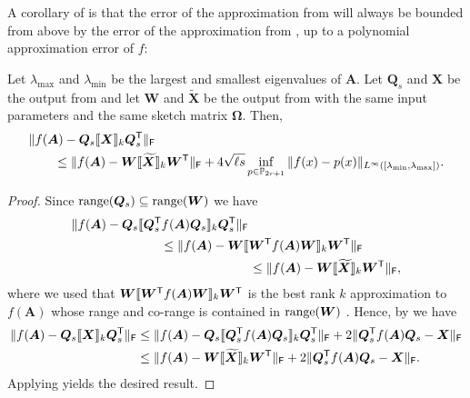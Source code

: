 A corollary of  is that the error of the approximation from  will always be bounded from above by the error of the approximation from , up to a polynomial approximation error of $f$:
\begin{corollary}
\label{corr:early_bigger_subspace}
    Let $\lambda_{\max}$ and $\lambda_{\min}$ be the largest and smallest eigenvalues of $\bm{A}$. Let $\bm{Q}_s$ and $\bm{X}$ be the output from  and let $\bm{W}$ and $\widetilde{\bm{X}}$ be the output from  with the same input parameters and the same sketch matrix $\bm{\Omega}$. Then,
    \begin{align*}
        &\|f(\bm{A}) - \bm{Q}_s \llbracket\bm{X}\rrbracket_k \bm{Q}_s^{\textsf{\textup{T}}}\|_{\textsf{\textup{F}}} 
        \\&\hspace{2em}
        \leq \|f(\bm{A}) - \bm{W} \llbracket\widetilde{\bm{X}}\rrbracket_k \bm{W}^{\textsf{\textup{T}}}\|_{\textsf{\textup{F}}} + 4\sqrt{\ell s}  \inf\limits_{p \in \mathbb{P}_{2r+1}}\|f(x)-p(x)\|_{L^{\infty}([\lambda_{\min},\lambda_{\max}])}.
    \end{align*}
\end{corollary}
\begin{proof}
    Since $\operatorname{range}(\bm{Q}_s) \subseteq \operatorname{range}(\bm{W})$ we have
    \begin{align*}
        &\|f(\bm{A}) - \bm{Q}_s\llbracket\bm{Q}_s^\T f(\bm{A})\bm{Q}_s \rrbracket_k\bm{Q}_s^\T\|_{\F} 
        \\&\hspace{7em}\leq \|f(\bm{A}) - \bm{W}\llbracket\bm{W}^\T f(\bm{A})\bm{W} \rrbracket_k\bm{W}^\T\|_{\F} 
        \\&\hspace{14em}\leq 
        \|f(\bm{A}) - \bm{W}\llbracket\widetilde{\bm{X}}\rrbracket_k\bm{W}^\T\|_{\F},
    \end{align*}
    where we used that $\bm{W}\llbracket\bm{W}^{\textsf{\textup{T}}} f(\bm{A})\bm{W} \rrbracket_k\bm{W}^{\textsf{\textup{T}}}$ is the best rank $k$ approximation to $f(\bm{A})$ whose range and co-range is contained in $\operatorname{range}(\bm{W})$ \cite[Lemma 3.3]{funnystrom2}. Hence, by  we have
    \begin{align*}
        \|f(\bm{A}) - \bm{Q}_s \llbracket \bm{X} \rrbracket_k \bm{Q}_s^{\textsf{\textup{T}}}\|_{\textsf{\textup{F}}} 
        &\leq \|f(\bm{A}) - \bm{Q}_s\llbracket\bm{Q}_s^{\textsf{\textup{T}}} f(\bm{A})\bm{Q}_s \rrbracket_k\bm{Q}_s^{\textsf{\textup{T}}}\|_{\textsf{\textup{F}}} + 2\|\bm{Q}_s^{\textsf{\textup{T}}} f(\bm{A})\bm{Q}_s - \bm{X}\|_{\textsf{\textup{F}}} 
        \\&\leq 
        \|f(\bm{A}) - \bm{W}\llbracket\widetilde{\bm{X}}\rrbracket_k\bm{W}^{\textsf{\textup{T}}}\|_{\textsf{\textup{F}}} + 2\|\bm{Q}_s^{\textsf{\textup{T}}} f(\bm{A})\bm{Q}_s - \bm{X}\|_{\textsf{\textup{F}}}.
    \end{align*}
    Applying  yields the desired result. 
\end{proof}
